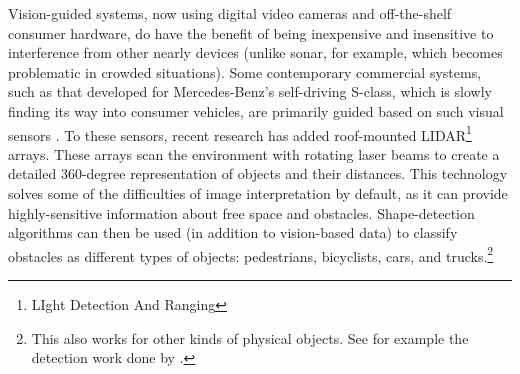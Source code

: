 Vision-guided systems, now using digital video cameras and
off-the-shelf consumer hardware, do have the benefit of being inexpensive
and insensitive to interference from other nearly devices (unlike
sonar, for example, which becomes problematic in crowded
situations). Some contemporary commercial systems, such as that
developed for Mercedes-Benz's 
self-driving S-class, which is slowly finding its way into consumer
vehicles, are primarily guided based on such visual sensors \cite{makingBertha}. To
these sensors, recent research has added roof-mounted
LIDAR\footnote{LIght Detection And Ranging} arrays.
These arrays scan the environment with 
rotating laser beams to create a detailed 360-degree
representation of objects and their distances. This technology
solves some of the difficulties of image interpretation by default, as
it can provide highly-sensitive information about free space and
obstacles. Shape-detection algorithms can then be used (in addition to
vision-based data) to classify obstacles as different types of
objects: pedestrians, bicyclists, cars, and trucks.\footnote{This also
  works for other kinds of physical objects. See for example the
  detection work done by \cite{fukuda}.}



